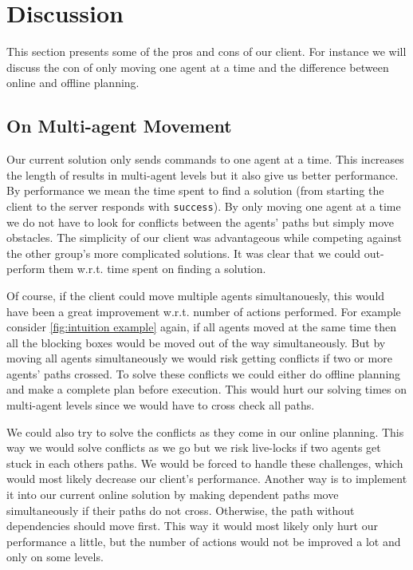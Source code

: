 \section{Discussion}
\label{sec:discussion}

This section presents some of the pros and cons of our client.
For instance we will discuss the con of only moving one agent at a time and the difference between online and offline planning.

\subsection{On Multi-agent Movement}
Our current solution only sends commands to one agent at a time.
This increases the length of results in multi-agent levels but it also give us better performance.
By performance we mean the time spent to find a solution (from starting the client to the server responds with \texttt{success}).
By only moving one agent at a time we do not have to look for conflicts between the agents' paths but simply move obstacles.
The simplicity of our client was advantageous while competing against the other group's more complicated solutions.
It was clear that we could out-perform them w.r.t. time spent on finding a solution.

Of course, if the client could move multiple agents simultanouesly, this would have been a great improvement w.r.t. number of actions performed.
For example consider \cref{fig:intuition example} again, if all agents moved at the same time then all the blocking boxes would be moved out of the way simultaneously.
But by moving all agents simultaneously we would risk getting conflicts if two or more agents' paths crossed.
To solve these conflicts we could either do offline planning and make a complete plan before execution.
This would hurt our solving times on multi-agent levels since we would have to cross check all paths.

We could also try to solve the conflicts as they come in our online planning.
This way we would solve conflicts as we go but we risk live-locks if two agents get stuck in each others paths.
We would be forced to handle these challenges, which would most likely decrease our client's performance.
Another way is to implement it into our current online solution by making dependent paths move simultaneously if their paths do not cross.
Otherwise, the path without dependencies should move first.
This way it would most likely only hurt our performance a little, but the number of actions would not be improved a lot and only on some levels.

